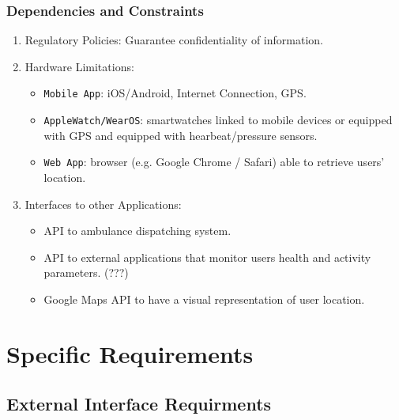 \documentclass[12pt,a4paper]{article}
\begin{document}
		\subsubsection{Dependencies and Constraints}
			\begin{enumerate}
				\item Regulatory Policies:
				Guarantee confidentiality of information.
				\item Hardware Limitations: 
				\begin{itemize}
					\item \texttt{Mobile App}: iOS/Android, Internet Connection, GPS.
					\item \texttt{AppleWatch/WearOS}: smartwatches linked to mobile devices or equipped with GPS and equipped with hearbeat/pressure sensors.
					\item \texttt{Web App}: browser (e.g. Google Chrome / Safari) able to retrieve users' location.
				\end{itemize}
				\item Interfaces to other Applications: 
				\begin{itemize}
					\item API to ambulance dispatching system.
					\item API to external applications that monitor users health and activity parameters. (???)
					\item Google Maps API to have a visual representation of user location.
				\end{itemize}
			\end{enumerate}
	
	\newpage
	\section{Specific Requirements}
		\subsection{External Interface Requirments}
\end{document}

